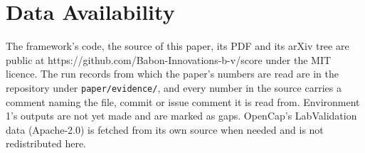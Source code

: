 \section*{Data Availability}\label{data-availability}

The framework's code, the source of this paper, its PDF and its arXiv tree are public at https://github.com/Babon-Innovations-b-v/score under the MIT licence. The run records from which the paper's numbers are read are in the repository under \texttt{paper/evidence/}, and every number in the source carries a comment naming the file, commit or issue comment it is read from. Environment 1's outputs are not yet made and are marked as gaps. OpenCap's LabValidation data (Apache-2.0) is fetched from its own source when needed and is not redistributed here.
